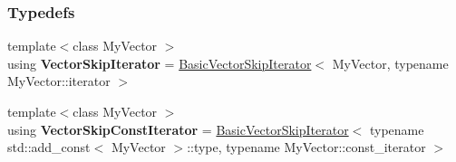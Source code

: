 \subsubsection*{Typedefs}
\begin{DoxyCompactItemize}
\item 
{\footnotesize template$<$class My\+Vector $>$ }\\using {\bfseries Vector\+Skip\+Iterator} = \hyperlink{structslb_1_1core_1_1util_1_1BasicVectorSkipIterator}{Basic\+Vector\+Skip\+Iterator}$<$ My\+Vector, typename My\+Vector\+::iterator $>$\hypertarget{namespaceslb_1_1core_1_1util_a52016fe00a4fae8791643b870848a79f}{}\label{namespaceslb_1_1core_1_1util_a52016fe00a4fae8791643b870848a79f}

\item 
{\footnotesize template$<$class My\+Vector $>$ }\\using {\bfseries Vector\+Skip\+Const\+Iterator} = \hyperlink{structslb_1_1core_1_1util_1_1BasicVectorSkipIterator}{Basic\+Vector\+Skip\+Iterator}$<$ typename std\+::add\+\_\+const$<$ My\+Vector $>$\+::type, typename My\+Vector\+::const\+\_\+iterator $>$\hypertarget{namespaceslb_1_1core_1_1util_a5692b540118495a35ebae95fb8b80790}{}\label{namespaceslb_1_1core_1_1util_a5692b540118495a35ebae95fb8b80790}

\end{DoxyCompactItemize}
